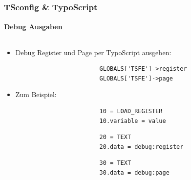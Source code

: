 \begin{frame}[fragile]
	\frametitle{TSconfig \& TypoScript}
	\framesubtitle{Debug Ausgaben}

	\begin{columns}[T]

		\begin{column}{.6\textwidth}
			\begin{itemize}
				\item Debug Register und Page per TypoScript ausgeben:

					\begin{lstlisting}
						GLOBALS['TSFE']->register
						GLOBALS['TSFE']->page
					\end{lstlisting}

				\item Zum Beispiel:

					\begin{lstlisting}
						10 = LOAD_REGISTER
						10.variable = value
					\end{lstlisting}

					\begin{lstlisting}
						20 = TEXT
						20.data = debug:register
					\end{lstlisting}

					\begin{lstlisting}
						30 = TEXT
						30.data = debug:page
					\end{lstlisting}

			\end{itemize}
		\end{column}


\end{columns}
\end{frame}
